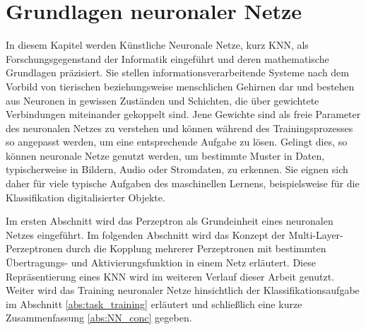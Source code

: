 \chapter{Grundlagen neuronaler Netze}
\label{kapitel_neuralnetworks}

In diesem Kapitel werden Künstliche Neuronale Netze\cite{dayhoff1990neural}, kurz KNN, als Forschungsgegenstand der Informatik eingeführt und deren mathematische Grundlagen präzisiert. 
Sie stellen informationsverarbeitende Systeme nach dem Vorbild von tierischen beziehungsweise menschlichen Gehirnen dar und bestehen aus Neuronen in gewissen Zuständen und Schichten, die über gewichtete Verbindungen miteinander gekoppelt sind. Jene Gewichte sind als freie Parameter des neuronalen Netzes zu verstehen und können während des Trainingsprozesses so angepasst werden, um eine entsprechende Aufgabe zu lösen.  
Gelingt dies, so können neuronale Netze genutzt werden, um bestimmte Muster in Daten, typischerweise in Bildern, Audio oder Stromdaten, zu erkennen\cite{pandya1995pattern, pao1989adaptive, urbaniak2021quality}.
Sie eignen sich daher für viele typische Aufgaben des maschinellen Lernens, beispielsweise für die Klassifikation digitalisierter Objekte.

Im ersten Abschnitt wird das Perzeptron\cite{rosenblatt1958perceptron} als Grundeinheit eines neuronalen Netzes eingeführt. 
Im folgenden Abschnitt wird das Konzept der Multi-Layer-Perzeptronen\cite{werbos1988generalization} durch die Kopplung mehrerer Perzeptronen mit bestimmten Übertragungs- und Aktivierungsfunktion in einem Netz erläutert. Diese Repräsentierung eines KNN wird im weiteren Verlauf dieser Arbeit genutzt. Weiter wird das Training neuronaler Netze hinsichtlich der Klassifikationsaufgabe im Abschnitt \ref{abs:task_training} erläutert und schließlich eine kurze Zusammenfassung \ref{abs:NN_conc} gegeben.

